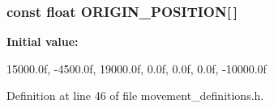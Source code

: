 \subsubsection[{\-O\-R\-I\-G\-I\-N\-\_\-\-P\-O\-S\-I\-T\-I\-O\-N}]{\setlength{\rightskip}{0pt plus 5cm}const float {\bf \-O\-R\-I\-G\-I\-N\-\_\-\-P\-O\-S\-I\-T\-I\-O\-N}[$\,$]}\label{movement__definitions_8h_a2ad0485bb435e29de38c196390aa2c8a}
{\bfseries \-Initial value\-:}
\begin{DoxyCode}
 {  15000.0f,
                                           -4500.0f,
                                           19000.0f,
                                               0.0f,
                                               0.0f,
                                               0.0f,
                                          -10000.0f }
\end{DoxyCode}


\-Definition at line 46 of file movement\-\_\-definitions.\-h.

